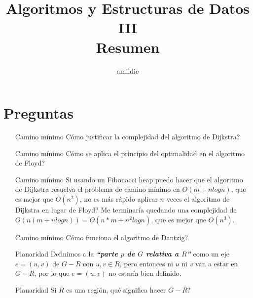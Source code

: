 \documentclass[10pt, a4paper]{article}
\title{Algoritmos y Estructuras de Datos III\\Resumen}
\author{amildie}
\date{\vspace{-5ex}}
\begin{document}
\renewcommand*\contentsname{\empty}

\maketitle
\tableofcontents















\newpage
\section{Preguntas}
\begin{enumerate}
\item [Camino m\'inimo] C\'omo justificar la complejidad del algoritmo de Dijkstra?
\item [Camino m\'inimo] C\'omo se aplica el principio del optimalidad en el algoritmo de Floyd?
\item [Camino m\'inimo] Si usando un Fibonacci heap puedo hacer que el algoritmo de Dijkstra resuelva el problema de camino m\'inimo en $O(m + n log n)$, que es mejor que $O(n^2)$, no es m\'as r\'apido aplicar $n$ veces el algoritmo de Dijkstra en lugar de Floyd? Me terminar\'ia quedando una complejidad de $O(n(m + n log n)) = $$O(n*m + n^2 log n)$, que es mejor que $O(n^3)$.
\item [Camino m\'inimo] C\'omo funciona el algoritmo de Dantzig?
\item [Planaridad] Definimos a la \textbf{\emph{``parte $p$ de $G$ relativa a $R$''}} como un eje $e = (u, v)$ de $G - R$ con $u,v \in R$, pero entonces ni $u$ ni $v$ van a estar en $G - R$, por lo que $e = (u, v)$ no estar\'ia bien definido.
\item [Planaridad] Si $R$ es una regi\'on, qu\'e significa hacer $G - R$?
\end{enumerate}
\end{document}
